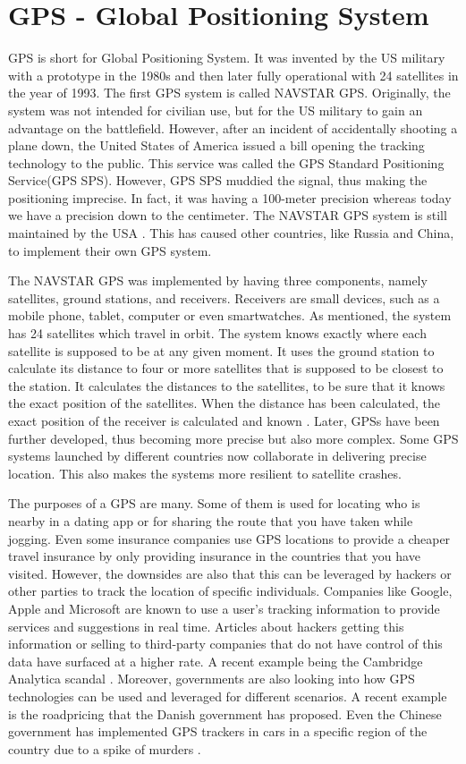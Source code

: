 \section{GPS - Global Positioning System}
GPS is short for Global Positioning System. It was invented by the US military with a prototype in the 1980s and then later fully operational with 24 satellites in the year of 1993. The first GPS system is called NAVSTAR GPS. Originally, the system was not intended for civilian use, but for the US military to gain an advantage on the battlefield. However, after an incident of accidentally shooting a plane down, the United States of America issued a bill opening the tracking technology to the public. This service was called the GPS Standard Positioning Service(GPS SPS). However, GPS SPS muddied the signal, thus making the positioning imprecise. In fact, it was having a 100-meter precision whereas today we have a precision down to the centimeter. The NAVSTAR GPS system is still maintained by the USA \cite{wiki:gps}. This has caused other countries, like Russia and China, to implement their own GPS system.

The NAVSTAR GPS was implemented by having three components, namely satellites, ground stations, and receivers. Receivers are small devices, such as a mobile phone, tablet, computer or even smartwatches. As mentioned, the system has 24 satellites which travel in orbit. The system knows exactly where each satellite is supposed to be at any given moment. It uses the ground station to calculate its distance to four or more satellites that is supposed to be closest to the station. It calculates the distances to the satellites, to be sure that it knows the exact position of the satellites. When the distance has been calculated, the exact position of the receiver is calculated and known \cite{nasa:gps}. Later, GPSs have been further developed, thus becoming more precise but also more complex. Some GPS systems launched by different countries now collaborate in delivering precise location. This also makes the systems more resilient to satellite crashes. 

The purposes of a GPS are many. Some of them is used for locating who is nearby in a dating app or for sharing the route that you have taken while jogging. Even some insurance companies use GPS locations to provide a cheaper travel insurance by only providing insurance in the countries that you have visited. However, the downsides are also that this can be leveraged by hackers or other parties to track the location of specific individuals. Companies like Google, Apple and Microsoft are known to use a user's tracking information to provide services and suggestions in real time. Articles about hackers getting this information or selling to third-party companies that do not have control of this data have surfaced at a higher rate. A recent example being the Cambridge Analytica scandal \cite{newyorktimes:facebook}. Moreover, governments are also looking into how GPS technologies can be used and leveraged for different scenarios. A recent example is the roadpricing that the Danish government has proposed. Even the Chinese government has implemented GPS trackers in cars in a specific region of the country due to a spike of murders \cite{guardian:2017}.

